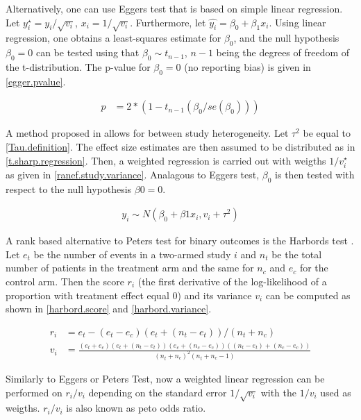 \documentclass[11pt,a4paper,twoside]{book}\usepackage[]{graphicx}\usepackage[]{color}
\begin{document}
\vspace{0mm}
Alternatively, one can use Eggers test \citep{Egger} that is based on simple linear regression. Let $y_{i}^\star = y_{i}/\sqrt{v_{i}}$, $x_{i} = 1/\sqrt{v_{i}}$. Furthermore, let $\hat{y_{i}} = \beta_{0} + \beta_{1}x_{i}$. Using linear regression, one obtains a least-squares estimate for $\beta_{0}$, and the null hypothesis $\beta_{0} = 0$ can be tested using that $\beta_{0} \sim t_{n-1}$, $n-1$ being the degrees of freedom of the t-distribution. The p-value for $\beta_{0} = 0$ (no reporting bias) is given in \ref{egger.pvalue}.

\begin{align}
p &= 2*(1 - t_{n-1}(\beta_{0}/se(\beta_{0}))) \label{egger.pvalue}
\end{align}

A method proposed in \citet{thompson.sharp} allows for between study heterogeneity. Let $\tau^2$ be equal to \ref{Tau.definition}. The effect size estimates are then assumed to be distributed as in \ref{t.sharp.regression}. Then, a weighted regression is carried out with weigths $1/v_{i}^\star$ as given in \ref{ranef.study.variance}. Analagous to Eggers test, $\beta_{0}$ is then tested with respect to the null hypothesis $\beta{0} = 0$.

\begin{align}
y_{i} \sim N(\beta_{0} + \beta{1}x_{i}, v_{i} + \tau^2) \label{t.sharp.regression}
\end{align}

A rank based alternative to Peters test for binary outcomes is the Harbords test \citep{Harbord}. Let $e_{t}$ be the number of events in a two-armed study $i$ and $n_{t}$ be the total number of patients in the treatment arm and the same for $n_{c}$ and $e_{c}$ for the control arm. Then the score $r_{i}$ (the first derivative of the log-likelihood of a proportion with treatment effect equal 0) and its variance $v_{i}$ can be computed as shown in \ref{harbord.score} and \ref{harbord.variance}.

\begin{align}
r_{i} &= e_{t} - (e_{t} - e_{c})(e_{t} + (n_{t} - e_{t}))/(n_{t} + n_{c}) \label{harbord.score} \\
v_{i} &= \frac{(e_{t} + e_{c})(e_{t} + (n_{t} - e_{t}))(e_{c} + (n_{c} - e_{c}))((n_{t} - e_{t}) + (n_{c} - e_{c}))}{(n_{t} + n_{c})^2(n_{t} + n_{c} - 1)} \label{harbord.variance}
\end{align}

Similarly to Eggers or Peters Test, now a weighted linear regression can be performed on $r_{i}/v_{i}$ depending on the standard error $1/\sqrt{v_{i}}$ with the $1/v_{i}$ used as weigths. $r_{i}/v_{i}$ is also known as peto odds ratio. 
\end{document}
